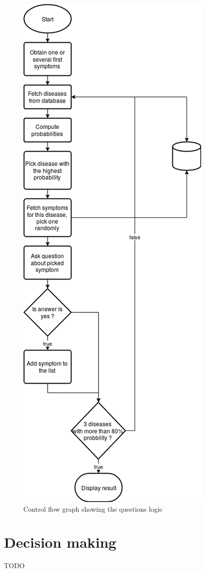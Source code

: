 \begin{figure}[H]
	\centering
	\includegraphics[height=0.9\textheight]{flow_chart_questions}
	\caption{Control flow graph showing the questions logic}
	\label{cfg_logic}
\end{figure}

\section{Decision making}

TODO